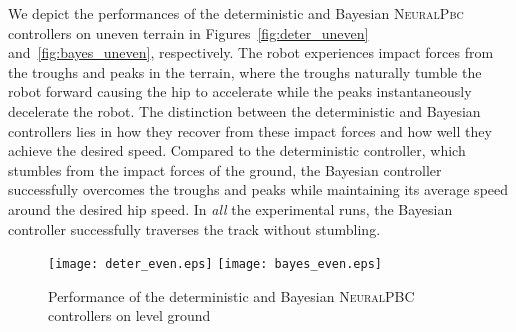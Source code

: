 We depict the performances of the deterministic and Bayesian \textsc{NeuralPbc}
controllers on uneven terrain in Figures~\ref{fig:deter_uneven}
and~\ref{fig:bayes_uneven}, respectively.
%
The robot experiences impact forces from the troughs and peaks in the terrain,
where the troughs naturally tumble the robot forward causing the hip to accelerate
while the peaks instantaneously decelerate the robot.  
%
The distinction between the deterministic and Bayesian controllers lies in how
they recover from these impact forces and how well they achieve the desired
speed.
%
Compared to the deterministic controller, which stumbles from the impact
forces of the ground, the Bayesian controller successfully overcomes the troughs
and peaks while maintaining its average speed around the desired hip speed.
%
In \textit{all} the experimental runs, the Bayesian controller successfully
traverses the track without stumbling. 
%
\begin{figure}[H]
    \centering
    \texttt{[image: deter\_even.eps]}\hfill
    \texttt{[image: bayes\_even.eps]}
    \caption{Performance of the deterministic and Bayesian \textsc{NeuralPBC} controllers on level ground}
    \label{fig:deter_vs_bayes_hardware_even}
\end{figure}
%
